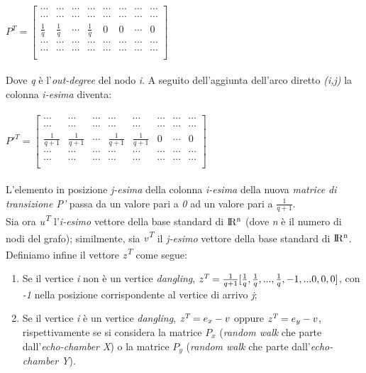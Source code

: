 $P^T = \begin{bmatrix}
       \cdots & \cdots & \cdots & \cdots & \cdots & \cdots & \cdots & \cdots \\[0.3em]
       \cdots & \cdots & \cdots & \cdots & \cdots & \cdots & \cdots & \cdots \\[0.3em]
       \frac{1}{q} & \frac{1}{q} & \cdots & \frac{1}{q} & 0 & 0 & \cdots & 0 \\[0.3em]
       \cdots & \cdots & \cdots & \cdots & \cdots & \cdots & \cdots & \cdots \\[0.3em]
       \cdots & \cdots & \cdots & \cdots & \cdots & \cdots & \cdots & \cdots \\[0.3em]
     \end{bmatrix}$
\\\\
Dove \textit{q} è l'\textit{out-degree} del nodo \textit{i}. A seguito dell'aggiunta dell'arco diretto \textit{(i,j)} la colonna \textit{i-esima} diventa:
\\\\
$P'^T = \begin{bmatrix}
       \cdots & \cdots & \cdots & \cdots & \cdots & \cdots & \cdots & \cdots \\[0.3em]
       \cdots & \cdots & \cdots & \cdots & \cdots & \cdots & \cdots & \cdots \\[0.3em]
       \frac{1}{q+1} & \frac{1}{q+1} & \cdots & \frac{1}{q+1} & \frac{1}{q+1} & 0 & \cdots & 0 \\[0.3em]
       \cdots & \cdots & \cdots & \cdots & \cdots & \cdots & \cdots & \cdots \\[0.3em]
       \cdots & \cdots & \cdots & \cdots & \cdots & \cdots & \cdots & \cdots \\[0.3em]
     \end{bmatrix}$
\\\\
L'elemento in posizione \textit{j-esima} della colonna \textit{i-esima} della nuova \textit{matrice di transizione P'} passa da un valore pari a \textit{0} ad un valore pari a $\frac{1}{q+1}$.
\\Sia ora \textit{u\textsuperscript{T}} l'\textit{i-esimo} vettore della base standard di ${\rm I\!R^n}$ (dove \textit{n} è il numero di nodi del grafo); similmente, sia \textit{v\textsuperscript{T}} il \textit{j-esimo} vettore della base standard di ${\rm I\!R^n}$. 
\\Definiamo infine il vettore \textit{z\textsuperscript{T}} come segue:
\begin{enumerate}
\item Se il vertice \textit{i} non è un vertice \textit{dangling}, $\textit{z\textsuperscript{T}} = \frac{1}{q+1}[\frac{1}{q},\frac{1}{q},...,\frac{1}{q},-1,...0,0,0]$, con \textit{-1} nella posizione corrispondente al vertice di arrivo \textit{j};
\item Se il vertice \textit{i} è un vertice \textit{dangling}, $\textit{z\textsuperscript{T}} = e_x - v$ oppure $\textit{z\textsuperscript{T}} = e_y - v$, rispettivamente se si considera la matrice $P_x$ (\textit{random walk} che parte dall'\textit{echo-chamber X}) o la matrice $P_y$ (\textit{random walk} che parte dall'\textit{echo-chamber Y}).
\end{enumerate}
